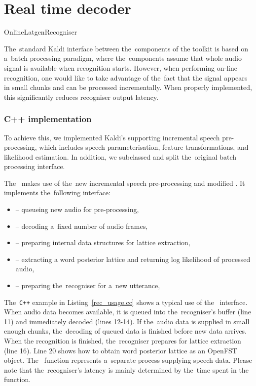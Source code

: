 \chapter{Real time decoder}
\label{cha:decoder}


{OnlineLatgenRecogniser}
\label{sec:impl}

The~standard Kaldi interface between the~components of the toolkit is based on a~batch processing paradigm, where the~components assume that whole audio signal is available when recognition starts.
However, when performing on-line recognition, one would like to take advantage of the~fact that the signal appears in small chunks and can be processed incrementally.
When properly implemented, this significantly reduces recogniser output latency.

\subsection{C++ implementation}
\label{sub:verb_c_}

To achieve this, we implemented Kaldi's  supporting incremental speech pre-processing, which includes speech parameterisation, feature transformations, and likelihood estimation.
In addition, we subclassed  and split the~original batch processing interface.

The~ makes use of the~new incremental speech pre-processing and modified .
It implements the~following interface:
\begin{itemize}
\item {} -- queueing new audio for pre-processing,
\item {} -- decoding a~fixed number of audio frames,
\item {} -- preparing internal data structures for lattice extraction,
\item {} -- extracting a word posterior lattice and returning log likelihood of processed audio,
\item {} -- preparing the~recogniser for a~new utterance,
\end{itemize}

The~\verb!C++! example in Listing~\ref{rec_usage.cc} shows a typical use of the~ interface.
When audio data becomes available, it is queued into the~recogniser's buffer (line 11) and immediately decoded (lines 12-14).
If the~audio data is supplied in small enough chunks, the~decoding of queued data is finished before new data arrives.
When the recognition is finished, the~recogniser prepares for lattice extraction (line 16).
Line 20 shows how to obtain word posterior lattice as an OpenFST object.
The~ function represents a~separate process supplying speech data.
Please note that the~recogniser's latency is mainly determined by the~time spent in the~ function.

